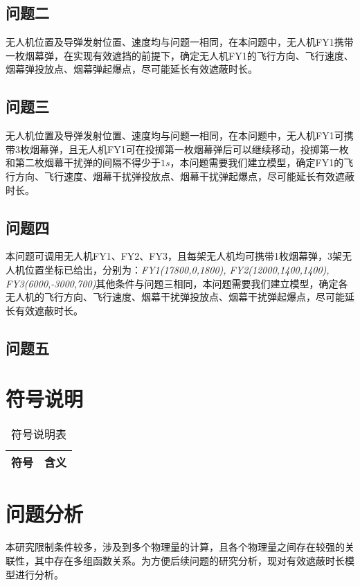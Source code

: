 \documentclass{article}
\begin{document}
\subsection{问题二}

无人机位置及导弹发射位置、速度均与问题一相同，在本问题中，无人机FY1携带一枚烟幕弹，在实现有效遮挡的前提下，确定无人机FY1的飞行方向、飞行速度、烟幕弹投放点、烟幕弹起爆点，尽可能延长有效遮蔽时长。
\subsection{问题三}

无人机位置及导弹发射位置、速度均与问题一相同，在本问题中，无人机FY1可携带3枚烟幕弹，且无人机FY1可在投掷第一枚烟幕弹后可以继续移动，投掷第一枚和第二枚烟幕干扰弹的间隔不得少于$1s$，本问题需要我们建立模型，确定FY1的飞行方向、飞行速度、烟幕干扰弹投放点、烟幕干扰弹起爆点，尽可能延长有效遮蔽时长。
\subsection{问题四}

本问题可调用无人机FY1、FY2、FY3，且每架无人机均可携带1枚烟幕弹，3架无人机位置坐标已给出，分别为：\textit{FY1(17800,0,1800), FY2(12000,1400,1400), FY3(6000,-3000,700)}其他条件与问题三相同，本问题需要我们建立模型，确定各无人机的飞行方向、飞行速度、烟幕干扰弹投放点、烟幕干扰弹起爆点，尽可能延长有效遮蔽时长。
\subsection{问题五}

\section{符号说明}

\begin{table}[H]
\centering
\caption{符号说明表}
\begin{tabular}{|c|l|}
\hline
符号 & 含义 \\
\hline



\hline
\end{tabular}
\end{table}

\section{问题分析}
本研究限制条件较多，涉及到多个物理量的计算，且各个物理量之间存在较强的关联性，其中存在多组函数关系。为方便后续问题的研究分析，现对有效遮蔽时长模型进行分析。
\end{document}
